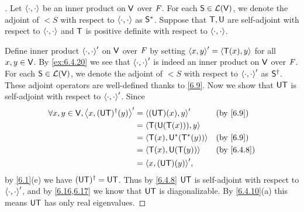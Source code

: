 \begin{proof}[]
  Let \(\left\langle\cdot, \cdot\right\rangle\) be an inner product on \(\mathsf{V}\) over \(\mathit{F}\).
  For each \(\mathsf{S} \in \mathcal{L}(\mathsf{V})\), we denote the adjoint of \(\lt{S}\) with respect to \(\left\langle\cdot, \cdot\right\rangle\) as \(\mathsf{S}^*\).
  Suppose that \(\mathsf{T}, \mathsf{U}\) are self-adjoint with respect to \(\left\langle\cdot, \cdot\right\rangle\) and \(\mathsf{T}\) is positive definite with respect to \(\left\langle\cdot, \cdot\right\rangle\).

  Define inner product \(\left\langle\cdot, \cdot\right\rangle'\) on \(\mathsf{V}\) over \(\mathit{F}\) by setting \(\left\langle x, y\right\rangle' = \left\langle\mathsf{T}(x), y\right\rangle\) for all \(x, y \in \mathsf{V}\).
  By \cref{ex:6.4.20} we see that \(\left\langle\cdot, \cdot\right\rangle'\) is indeed an inner product on \(\mathsf{V}\) over \(\mathit{F}\).
  For each \(\mathsf{S} \in \mathcal{L}(\mathsf{V})\), we denote the adjoint of \(\lt{S}\) with respect to \(\left\langle\cdot, \cdot\right\rangle'\) as \(\mathsf{S}^{\dag}\).
  These adjoint operators are well-defined thanks to \cref{6.9}.
  Now we show that \(\mathsf{U} \mathsf{T}\) is self-adjoint with respect to \(\left\langle\cdot, \cdot\right\rangle'\).
  Since
  \begin{align*}
    \forall x, y \in \V, \inn{x, (\U \T)^{\dag}(y)}' & = \inn{(\U \T)(x), y}'       &  & \by{6.9}   \\
                                                     & = \inn{\T(\U(\T(x))), y}                     \\
                                                     & = \inn{\T(x), \U^*(\T^*(y))} &  & \by{6.9}   \\
                                                     & = \inn{\T(x), \U(\T(y))}     &  & \by{6.4.8} \\
                                                     & = \inn{x, (\U \T)(y)}',
  \end{align*}
  by \cref{6.1}(e) we have \((\mathsf{U} \mathsf{T})^{\dag} = \mathsf{U} \mathsf{T}\).
  Thus by \cref{6.4.8} \(\mathsf{U} \mathsf{T}\) is self-adjoint with respect to \(\left\langle\cdot, \cdot\right\rangle'\), and by \cref{6.16,6.17} we know that \(\mathsf{U} \mathsf{T}\) is diagonalizable.
  By \cref{6.4.10}(a) this means \(\mathsf{U} \mathsf{T}\) has only real eigenvalues.


\end{proof}
